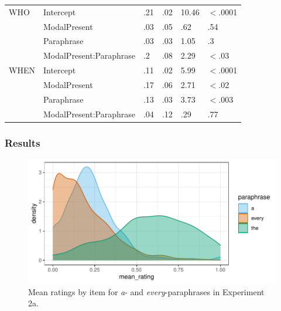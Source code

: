 \documentclass[12pt,letterpaper,table,svgnames,dvipsnames]{article}
\begin{document}
\begin{table}
\begin{center}
\begin{tabular}{l|lllll}
\midrule
WHO & Intercept & .21 & .02 & 10.46 & $<$.0001\\
{} & ModalPresent & .03 & .05 & .62 & .54\\
{} & Paraphrase & .03 & .03 & 1.05 & .3\\
{} & ModalPresent:Paraphrase & .2 & .08 & 2.29 & $<$.03\\
\midrule
WHEN & Intercept & .11 & .02 & 5.99 & $<$.0001\\
{} & ModalPresent & .17 & .06 & 2.71 & $<$.02\\
{} & Paraphrase & .13 & .03 & 3.73 & $<$.003\\
{} & ModalPresent:Paraphrase & .04 & .12 & .29 & .77\\
\bottomrule
\end{tabular} 
\end{center} 
\end{table}



\subsubsection{Results}

\begin{figure}[h!]
\centering
\includegraphics[scale=1]{figures/ex2a_denisty_mean_ratings.pdf}
\caption{Mean ratings by item for \emph{a}- and \emph{every}-paraphrases in Experiment 2a.}
\label{ex2a_density_mr}
\end{figure}

\end{document}
